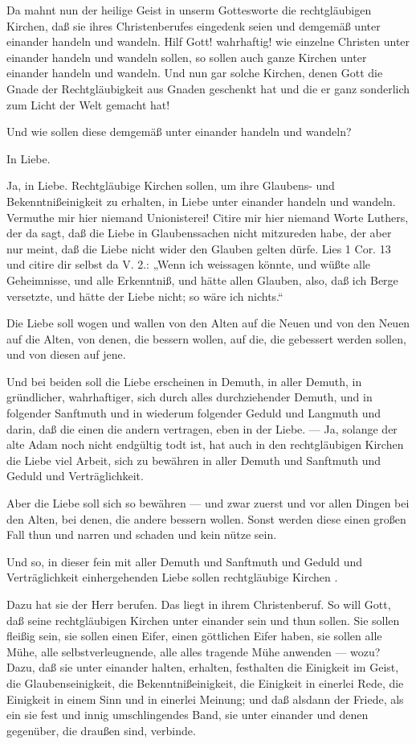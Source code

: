 Da mahnt nun der heilige Geist in unserm Gottesworte die rechtgläubigen Kirchen, daß sie ihres Christenberufes eingedenk seien und demgemäß unter einander handeln und wandeln. Hilf Gott! wahrhaftig! wie einzelne Christen unter einander handeln und wandeln sollen, so sollen auch ganze Kirchen unter einander handeln und wandeln. Und nun gar solche Kirchen, denen Gott die Gnade der Rechtgläubigkeit aus Gnaden geschenkt hat und die er ganz sonderlich zum Licht der Welt gemacht hat!

Und wie sollen diese demgemäß unter einander handeln und wandeln?

In Liebe.

Ja, in Liebe. Rechtgläubige Kirchen sollen, um ihre Glaubens- und Bekenntnißeinigkeit zu erhalten, in Liebe unter einander handeln und wandeln. Vermuthe mir hier niemand Unionisterei! Citire mir hier niemand Worte Luthers, der da sagt, daß die Liebe in Glaubenssachen nicht mitzureden habe, der aber nur meint, daß die Liebe nicht wider den Glauben gelten dürfe. Lies 1 Cor. 13 und citire dir selbst da V. 2.: „Wenn ich weissagen könnte, und wüßte alle Geheimnisse, und alle Erkenntniß, und hätte allen Glauben, also, daß ich Berge versetzte, und hätte der Liebe nicht; so wäre ich nichts.“

Die Liebe soll wogen und wallen von den Alten auf die Neuen und von den Neuen auf die Alten, von denen, die bessern wollen, auf die, die gebessert werden sollen, und von diesen auf jene.

Und bei beiden soll die Liebe erscheinen in Demuth, in aller Demuth, in gründlicher, wahrhaftiger, sich durch alles durchziehender Demuth, und in folgender Sanftmuth und in wiederum folgender Geduld und Langmuth und darin, daß die einen die andern vertragen, eben in der Liebe. — Ja, solange der alte Adam noch nicht endgültig todt ist, hat auch in den rechtgläubigen Kirchen die Liebe viel Arbeit, sich zu bewähren in aller Demuth und Sanftmuth und Geduld und Verträglichkeit.

Aber die Liebe soll sich so bewähren — und zwar zuerst und vor allen Dingen bei den Alten, bei denen, die andere bessern wollen. Sonst werden diese einen großen Fall thun und narren und schaden und kein nütze sein.

Und so, in dieser fein mit aller Demuth und Sanftmuth und Geduld und Verträglichkeit einhergehenden Liebe sollen rechtgläubige Kirchen .

Dazu hat sie der Herr berufen. Das liegt in ihrem Christenberuf. So will Gott, daß seine rechtgläubigen Kirchen unter einander sein und thun sollen. Sie sollen fleißig sein, sie sollen einen Eifer, einen göttlichen Eifer haben, sie sollen alle Mühe, alle selbstverleugnende, alle alles tragende Mühe anwenden — wozu? Dazu, daß sie unter einander halten, erhalten, festhalten die Einigkeit im Geist, die Glaubenseinigkeit, die Bekenntnißeinigkeit, die Einigkeit in einerlei Rede, die Einigkeit in einem Sinn und in einerlei Meinung; und daß alsdann der Friede, als ein sie fest und innig umschlingendes Band, sie unter einander und denen gegenüber, die draußen sind, verbinde.

